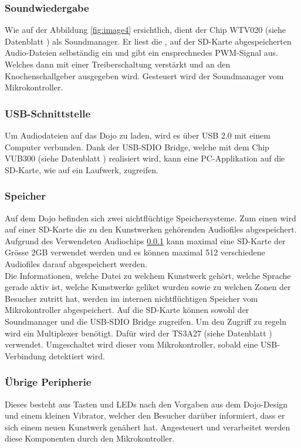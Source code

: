 \documentclass[10pt,a4paper,oneside]{99_fhnwreport}
\begin{document}
\subsubsection{Soundwiedergabe} \label{sec:sound}
Wie auf der Abbildung \ref{fig:image4} ersichtlich, dient der Chip WTV020 (siehe Datenblatt \cite{WTV020}) als Soundmanager. Er liest die , auf der SD-Karte abgespeicherten Audio-Dateien selbständig ein und gibt ein ensprechnedes PWM-Signal aus. Welches dann mit einer Treiberschaltung verstärkt und an den Knochenschallgeber ausgegeben wird. Gesteuert wird der Soundmanager vom  Mikrokontroller.

\subsubsection{USB-Schnittstelle}
Um Audiodateien auf das Dojo zu laden, wird es über USB 2.0 mit einem Computer verbunden. Dank der USB-SDIO Bridge, welche mit dem Chip VUB300 (siehe Datenblatt \cite{VUB300}) realisiert wird, kann eine PC-Applikation auf die SD-Karte, wie auf ein Laufwerk, zugreifen.

\subsubsection{Speicher}\label{sec:speicher}
Auf dem Dojo befinden sich zwei nichtflüchtige Speichersysteme.  Zum einen wird auf einer SD-Karte die zu den Kunstwerken gehörenden Audiofiles abgespeichert. Aufgrund des Verwendeten Audiochips \ref{sec:sound} kann maximal eine SD-Karte der Grösse 2GB verwendet werden und es können maximal 512 verschiedene Audiofiles darauf abgespeichert werden.\\
Die Informationen, welche Datei zu welchem Kunstwerk gehört, welche Sprache gerade aktiv ist, welche Kunstwerke geliket wurden sowie zu welchen Zonen der Besucher zutritt hat, werden im internen nichtflüchtigen Speicher vom Mikrokontroller abgespeichert. Auf die SD-Karte können sowohl der Soundmanager und die USB-SDIO Bridge zugreifen. Um den Zugriff zu regeln wird ein Multiplexer benötigt. Dafür wird der TS3A27 (siehe Datenblatt \cite{TS3A27518E}) verwendet. Umgeschaltet wird dieser vom Mikrokontroller, sobald eine USB-Verbindung detektiert wird.

\subsubsection{Übrige Peripherie}
Dieses besteht aus Tasten und LEDs nach den Vorgaben aus dem Dojo-Design und einem kleinen Vibrator, welcher den Besucher darüber informiert, dass er sich einem neuen Kunstwerk genähert hat. Angesteuert und verarbeitet werden diese Komponenten durch den Mikrokontroller.
\end{document}
